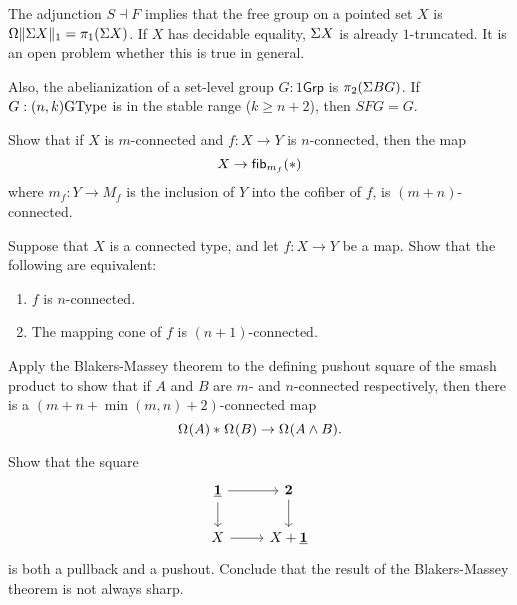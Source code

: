 The adjunction ${S} \dashv {F}$ implies that the free group on a
pointed set $X$ is $\loopspacesym\trunc{1}{\susp X}=\pi_1(\susp X)$.  If $X$
has decidable equality, $\susp X$ is already $1$-truncated. It is an
open problem whether this is true in general.

Also, the abelianization of a set-level group $G : 1\mathsf{Grp}$ is
$\pi_2(\susp BG)$. If $G : (n,k)\GType$ is in the stable range ($k \ge
n+2$), then $SFG=G$.

\begin{exercises}
\item Show that if $X$ is $m$-connected and $f:X\to Y$ is $n$-connected, then the map
\begin{equation*}
X \to \fib{m_f}{\ast}
\end{equation*}
where $m_f:Y\to M_f$ is the inclusion of $Y$ into the cofiber of $f$, is $(m+n)$-connected.
\item Suppose that $X$ is a connected type, and let $f:X\to Y$ be a map.
Show that the following are equivalent:
\begin{enumerate}
\item $f$ is $n$-connected.
\item The mapping cone of $f$ is $(n+1)$-connected.
\end{enumerate}
\item Apply the Blakers-Massey theorem to the defining pushout square of the smash product to show that if $A$ and $B$ are $m$- and $n$-connected respectively, then there is a $(m+n+\min(m,n)+2)$-connected map
\begin{equation*}
\join{\loopspace{A}}{\loopspace{B}}\to \loopspace{A \wedge B}.
\end{equation*}
\item Show that the square
\begin{equation*}
\begin{tikzcd}
\unit \arrow[r] \arrow[d] & \bool \arrow[d] \\
X \arrow[r] & X+\unit
\end{tikzcd}
\end{equation*}
is both a pullback and a pushout. Conclude that the result of the Blakers-Massey theorem is not always sharp.
\end{exercises}
